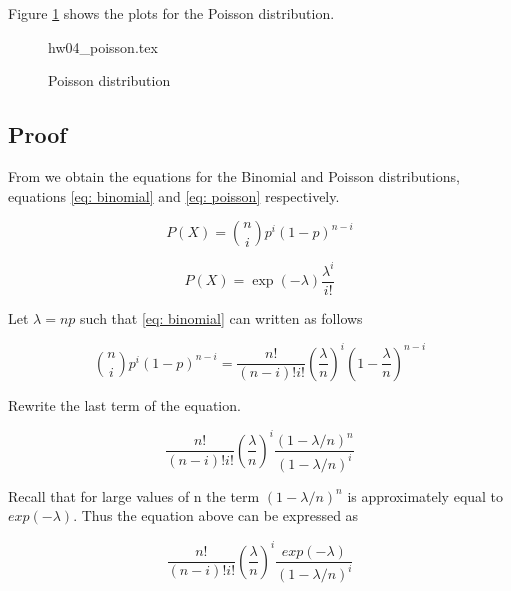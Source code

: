 \documentclass[a4paper,12pt]{article}
\begin{document}
\pagebreak

Figure \ref{fig: poisson plots} shows the plots for the Poisson distribution.\\

\begin{figure}[htb!]
\centering
{hw04_poisson.tex}
\caption{Poisson distribution}
\label{fig: poisson plots}
\end{figure}

\pagebreak

\subsection{Proof}

From \cite{ross2006introduction} we obtain the equations for the Binomial and Poisson distributions, equations \eqref{eq: binomial} and \eqref{eq: poisson} respectively.

\begin{equation}
P (X) = \binom n i p^i (1 -p)^{n-i}
\label{eq: binomial}
\end{equation}

\begin{equation}
 P (X) = \exp(-\lambda) \dfrac{\lambda ^i}{i !}
 \label{eq: poisson}
\end{equation}

Let $\lambda = n p$ such that \eqref{eq: binomial} can written as follows

\begin{equation*}
 \binom n i p^i (1 -p)^{n-i} = \dfrac{n!}{(n-i)!  i!} \left (\frac{\lambda}{n} \right )^i \left(1 -\dfrac{\lambda}{n}\right)^{n-i}
\end{equation*}

Rewrite the last term of the equation.

\begin{equation}
 \dfrac{n!}{(n-i)!  i!} \left (\frac{\lambda}{n} \right )^i \dfrac{(1 - \lambda / n  )^n}{(1 - \lambda / n  )^i}
 \label{eq: binomial to poisson fraction}
\end{equation}

Recall that for large values of n the term $(1 - \lambda / n  )^n $ is approximately equal to $ exp(-\lambda)$.
Thus the equation above can be expressed as

 \begin{equation}
  \dfrac{n!}{(n-i)!  i!} \left (\frac{\lambda}{n} \right )^i \dfrac{exp(-\lambda)}{(1 - \lambda / n  )^i}
   \label{eq: binomial to poisson exp}
 \end{equation}
\end{document}
